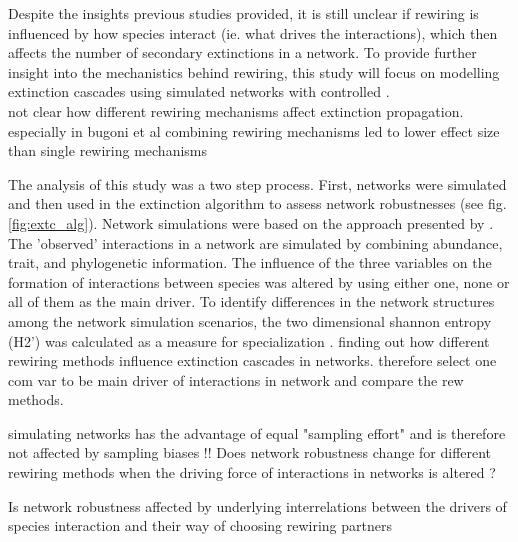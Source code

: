 \documentclass[12pt,a4paper]{article}
\begin{document}
Despite the insights previous studies provided, it is still unclear if rewiring is influenced by how species interact (ie. what drives the interactions), which then affects the number of secondary extinctions in a network. To provide further insight into the mechanistics behind rewiring, this study will focus on modelling extinction cascades using simulated networks with controlled . \\

	not clear how different rewiring mechanisms affect extinction propagation. especially in bugoni et al combining rewiring mechanisms led to lower effect size than single rewiring mechanisms

The analysis of this study was a two step process. First, networks were simulated and then used in the extinction algorithm to assess network robustnesses (see fig. \ref{fig:extc_alg}).  
Network simulations were based on the approach presented by \citeauthor{Benadi} \parencite{Benadi}. The 'observed' interactions in a network are simulated by combining abundance, trait, and phylogenetic information. The influence of the three variables on the formation of interactions between species was altered by using either one, none or all of them as the main driver.
To identify differences in the network structures among the network simulation scenarios, the two dimensional shannon entropy (H2') was calculated as a measure for specialization \parencite{Blüthgen2006}.
	finding out how different rewiring methods influence extinction cascades in networks. therefore select one com var to be main driver of interactions in network and compare the rew methods. 
	
	simulating networks has the advantage of equal "sampling effort" and is therefore not affected by sampling biases !!
Does network robustness change for different rewiring methods when the driving force of interactions in networks is altered ?

Is network robustness affected by underlying interrelations between the drivers of species interaction and their way of choosing rewiring partners 
\end{document}
